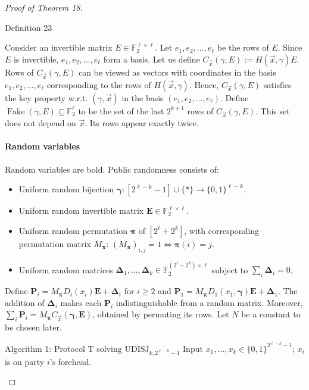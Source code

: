 \begin{proof}[Proof of Theorem 18]
\begin{authorclaim}{Definition 23}
\begin{itemize}
\end{itemize}
\end{authorclaim}
Consider an invertible matrix $E\in\mathbb F_2^{\ell\times\ell}$. Let $e_1,e_2,\ldots,e_\ell$ be the rows of $E$. Since $E$ is invertible, $e_1,e_2,\ldots,e_\ell$ form a basis. Let us define $C_{\vec x}(\gamma,E):=H(\vec x,\gamma)E$. Rows of $C_{\vec x}(\gamma,E)$ can be viewed as vectors with coordinates in the basis $e_1,e_2,\ldots,e_\ell$ corresponding to the rows of $H(\vec x,\gamma)$. Hence, $C_{\vec x}(\gamma,E)$ satisfies the key property w.r.t. $(\gamma,\vec x)$ in the basis $(e_1,e_2,\ldots,e_\ell)$.
Define $\operatorname{Fake}(\gamma,E)\subseteq\mathbb F_2^\ell$ to be the set of the last $2^{k+1}$ rows of $C_{\vec x}(\gamma,E)$. This set does not depend on $\vec x$. Its rows appear exactly twice.
\paragraph{Random variables}
Random variables are bold. Public randomness consists of:
\begin{itemize}
\item Uniform random bijection $\boldsymbol\gamma:[2^{\ell-k}-1]\cup\{*\}\to\{0,1\}^{\ell-k}$.
\item Uniform random invertible matrix $\mathbf E\in\mathbb F_2^{\ell\times\ell}$.
\item Uniform random permutation $\boldsymbol\pi$ of $[2^\ell+2^k]$, with corresponding permutation matrix $M_{\boldsymbol\pi}$: $(M_{\boldsymbol\pi})_{i,j}=1\Longleftrightarrow\boldsymbol\pi(i)=j$.
\item Uniform random matrices $\boldsymbol\Delta_1,\ldots,\boldsymbol\Delta_k\in\mathbb F_2^{(2^\ell+2^k)\times\ell}$ subject to $\sum_i\boldsymbol\Delta_i=0$.
\end{itemize}
Define $\mathbf P_i=M_{\boldsymbol\pi}D_i(x_i)\mathbf E+\boldsymbol\Delta_i$ for $i\ge2$ and $\mathbf P_1=M_{\boldsymbol\pi}D_1(x_1,\boldsymbol\gamma)\mathbf E+\boldsymbol\Delta_1$. The addition of $\boldsymbol\Delta_i$ makes each $\mathbf P_i$ indistinguishable from a random matrix. Moreover, $\sum_i\mathbf P_i=M_{\boldsymbol\pi}C_{\vec x}(\boldsymbol\gamma,\mathbf E)$, obtained by permuting its rows. Let $N$ be a constant to be chosen later.
\begin{authorclaim}{Algorithm 1: Protocol T solving $\mathrm{UDISJ}_{k,2^{\ell-k}-1}$}
Input $x_1,\ldots,x_k\in\{0,1\}^{2^{\ell-k}-1}$; $x_i$ is on party $i$'s forehead.
\begin{algorithmic}

\end{algorithmic}
\end{authorclaim}
\end{proof}
